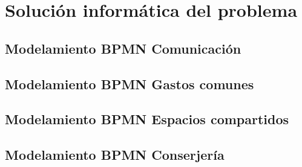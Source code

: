 \chapter{Solución informática del problema}
\section{Modelamiento BPMN Comunicación}
\section{Modelamiento BPMN Gastos comunes}
\section{Modelamiento BPMN Espacios compartidos}
\section{Modelamiento BPMN Conserjería}
